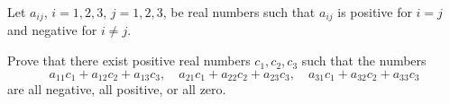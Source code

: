 Let $a_{ij}$, $i = 1, 2, 3$, $j = 1, 2, 3$, be real numbers such that $a_{ij}$ is positive for $i = j$ and negative for $i \neq j$.

Prove that there exist positive real numbers $c_1, c_2, c_3$ such that the numbers
\[ a_{11}c_1 + a_{12}c_2 + a_{13}c_3, \quad a_{21}c_1 + a_{22}c_2 + a_{23}c_3, \quad a_{31}c_1 + a_{32}c_2 + a_{33}c_3 \]
are all negative, all positive, or all zero.
